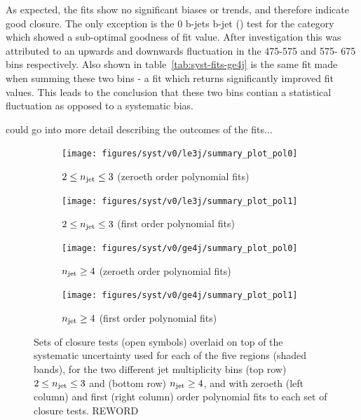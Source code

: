 As expected, the fits show no significant biases or trends, and therefore 
indicate good closure. The only exception is the 0 b-jets  b-jet (\mj) test
for the \njhigh category
which showed a sub-optimal goodness of fit value. After investigation this was 
attributed to an upwards and downwards fluctuation in the 475-575 \gev and 575-
675 \gev bins respectively. Also shown in table~\ref{tab:syst-fits-ge4j} is the 
same fit made when summing these two bins - a fit which returns significantly 
improved fit values. This leads to the conclusion that these two bins contian a 
statistical fluctuation as opposed to a systematic bias.

could go into more detail describing the outcomes of the fits...

\begin{figure}[ht!]
  \centering
  \begin{subfigure}[b]{0.46\textwidth}
    \texttt{[image: figures/syst/v0/le3j/summary\_plot\_pol0]}
    \caption{$2 \leq n_{\text{jet}} \leq 3$ (zeroeth order polynomial fits)}
    \label{fig:closure_fit_le3j_pol0}
  \end{subfigure}
  \begin{subfigure}[b]{0.46\textwidth}
    \texttt{[image: figures/syst/v0/le3j/summary\_plot\_pol1]}
    \caption{$2 \leq n_{\text{jet}} \leq 3$ (first order polynomial fits)}
    \label{fig:closure_fit_le3j_pol1}
  \end{subfigure}
  \begin{subfigure}[b]{0.46\textwidth}
    \texttt{[image: figures/syst/v0/ge4j/summary\_plot\_pol0]}
    \caption{$n_{\text{jet}} \geq 4$ (zeroeth order polynomial fits)}
    \label{fig:closure_fit_ge4j_pol0}
  \end{subfigure}
  \begin{subfigure}[b]{0.46\textwidth}
    \texttt{[image: figures/syst/v0/ge4j/summary\_plot\_pol1]}
    \caption{$n_{\text{jet}} \geq 4$ (first order polynomial fits)}
    \label{fig:closure_fit_ge4j_pol1}
  \end{subfigure}
  \caption{Sets of closure tests (open symbols) overlaid on top of
      the systematic uncertainty used for each of the five \HT
      regions (shaded bands), for the two different jet multiplicity
      bins (top row) $2 \leq n_{\text{jet}} \leq 3$ and (bottom row) $n_{\text{jet}}
      \geq 4$, and with zeroeth (left column) and first (right column)
      order polynomial fits to each set of closure tests. REWORD}
  \label{fig:closure_fits}
\end{figure}

